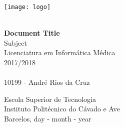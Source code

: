 \begin{titlepage}
    \begin{center}
        \texttt{[image: logo]}

        \vspace*{\fill}
        
        \HRule \\[0.4cm]
        {\huge \bfseries Document Title}\\
        \vspace{0.5cm}
        \large{Subject}\\
        \vspace{0.4cm}
        \small{Licenciatura em Informática Médica}\\
        \vspace{0.2cm}
        \small{2017/2018}\\
        \HRule \\
        \vspace{0.5cm}
        10199 - André Rios da Cruz\\[4cm]

        
        
        \vfill
        
        
        
        Escola Superior de Tecnologia\\
        Instituto Politécnico do Cávado e Ave\\
        Barcelos, day - month - year
    \end{center}
\end{titlepage}

\thispagestyle{empty}
\tableofcontents

